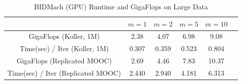 \documentclass{article} %
\begin{document}
%
%
 
%
%
\begin{table}[t]
\caption{BIDMach (GPU) Runtime and GigaFlops on Large Data}
\label{tab:tradeoff}
\begin{center}
\begin{tabular}{ |c|c|c|c|c|c| } 
\hline
               & $m=1$ & $m=2$ & $m=5$ & $m=10$ \\
\hline \hline
GigaFlops (Koller, 1M)         & 2.38  & 4.07  &  6.98  &  9.08  \\ 
Time(sec) / Iter (Koller, 1M)  & 0.307 & 0.359 &  0.523 &  0.804 \\
\hline
GigaFlops (Replicated MOOC)        & 2.69  & 4.46  & 7.83  & 10.37   \\ 
Time(sec) / Iter (Replicated MOOC) & 2.440 & 2.940 & 4.181 & 6.313   \\
\hline
\end{tabular}
\end{center}
\end{table}
\end{document}
